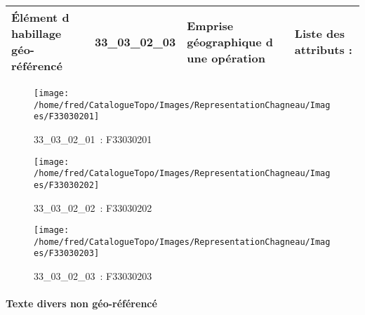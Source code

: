 \documentclass[12pt,titlepage,oneside]{book}
\begin{document}
\renewcommand{\arraystretch}{1.2}
\begin{supertabular}{|p{10cm}|c|p{13cm}|p{12cm}|}
 Élément d habillage géo-référencé & 33\_03\_02\_03 & Emprise géographique d une opération & Liste des attributs :
\begin{enumerate}
\end{enumerate}
\\
\hline
\end{supertabular}
\begin{figure}[h!]
  \hfill         %
  \begin{minipage}[t]{3cm}
    \begin{center}
      \texttt{[image: /home/fred/CatalogueTopo/Images/RepresentationChagneau/Images/F33030201]}
      \caption[~33\_03\_02\_01]{\small{33\_03\_02\_01~:} \tiny{F33030201}}\label{F33030201}
    \end{center}
  \end{minipage}
  \begin{minipage}[t]{3cm}
    \begin{center}
      \texttt{[image: /home/fred/CatalogueTopo/Images/RepresentationChagneau/Images/F33030202]}
      \caption[~33\_03\_02\_02]{\small{33\_03\_02\_02~:} \tiny{F33030202}}\label{F33030202}
    \end{center}
  \end{minipage}
  \begin{minipage}[t]{3cm}
    \begin{center}
      \texttt{[image: /home/fred/CatalogueTopo/Images/RepresentationChagneau/Images/F33030203]}
      \caption[~33\_03\_02\_03]{\small{33\_03\_02\_03~:} \tiny{F33030203}}\label{F33030203}
    \end{center}
  \end{minipage}
\end{figure}


\paragraph{Texte divers non géo-référencé}
\noindent
\vspace{\baselineskip}
\end{document}

